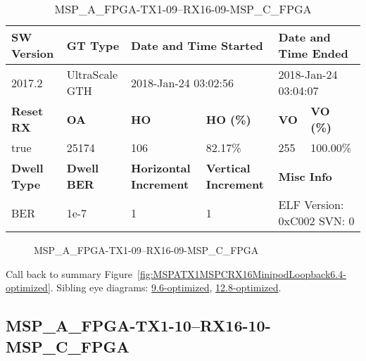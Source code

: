\begin{table}[h]
\centering
\caption{MSP\_A\_FPGA-TX1-09--RX16-09-MSP\_C\_FPGA}
\label{tab:MSPAFPGATX109RX1609MSPCFPGA6.4-optimized}
\begin{tabular}{@{}|l|l|l|l|l|l|@{}}
\toprule
\textbf{SW Version}                & \textbf{GT Type}   & \multicolumn{2}{l|}{\textbf{Date and Time Started}}            & \multicolumn{2}{l|}{\textbf{Date and Time Ended}}        \\ \midrule
2017.2                       & UltraScale GTH          & \multicolumn{2}{l|}{2018-Jan-24 03:02:56}                   & \multicolumn{2}{l|}{2018-Jan-24 03:04:07}               \\ \midrule
\textbf{Reset RX}                  & \textbf{OA} & \textbf{HO}   & \textbf{HO (\%)} & \textbf{VO} & \textbf{VO (\%)} \\ \midrule
true & 25174        & 106          & 82.17\%        & 255        & 100.00\%       \\ \midrule
\textbf{Dwell Type}                & \textbf{Dwell BER} & \textbf{Horizontal Increment} & \textbf{Vertical Increment}    & \multicolumn{2}{l|}{\textbf{Misc Info}}                  \\ \midrule
BER                            & 1e-7        & 1        & 1           & \multicolumn{2}{l|}{ELF Version: 0xC002 SVN: 0}                         \\ \bottomrule
\end{tabular}
\end{table}

\begin{figure}[h]
\caption{MSP\_A\_FPGA-TX1-09--RX16-09-MSP\_C\_FPGA} \label{fig:MSPAFPGATX109RX1609MSPCFPGA6.4-optimized}
\end{figure}

Call back to summary Figure~\ref{fig:MSPATX1MSPCRX16MinipodLoopback6.4-optimized}.
Sibling eye diagrams: \hyperref[sec:MSPAFPGATX109RX1609MSPCFPGA9.6-optimized]{9.6-optimized}, \hyperref[sec:MSPAFPGATX109RX1609MSPCFPGA12.8-optimized]{12.8-optimized}.

\clearpage
\newpage


\subsection{MSP\_A\_FPGA-TX1-10--RX16-10-MSP\_C\_FPGA}\label{sec:MSPAFPGATX110RX1610MSPCFPGA6.4-optimized}


